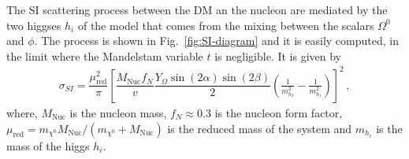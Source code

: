 \documentclass[12pt,letterpaper]{article}
\begin{document}
%
The SI scattering process between the DM an the nucleon are mediated by the two higgses $h_i$ of the model that comes from the mixing between the scalars $\Omega^0$ and $\phi$. The process is shown in Fig.~\ref{fig:SI-diagram} and it is easily computed, in the limit where the  Mandelstam variable $t$ is negligible. It is given by
%
\begin{align}
\label{eq:sigma-SI}
\sigma_{SI}=\dfrac{\mu_{\text{red}}^2}{\pi}\left[\dfrac{M_{\text{Nuc}}f_N}{v}\dfrac{Y_{\Omega}\sin(2\alpha)\sin(2\beta)}{2}\left(\frac{1}{m_{h_2}^2}-\frac{1}{m_{h_1}^2}\right)\right]^2\,,
\end{align}
%
where, $M_{\text{Nuc}}$ is the nucleon mass, $f_N\approx 0.3$ is the nucleon form factor, $\mu_{\text{red}}= m_{\chi^0}M_{\text{Nuc}}/(m_{\chi^0}+M_{\text{Nuc}})$ is the reduced mass of the system and  $m_{h_i}$ is the mass of the higgs $h_i$.
\end{document}
